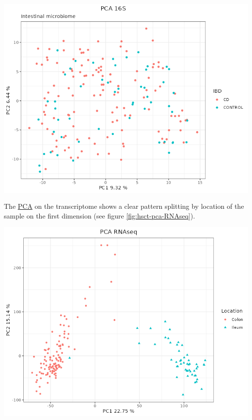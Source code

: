 \documentclass[
  12pt,
  a4paper,
  twoside,
  openright]{book}
\let\origfigure\figure
\let\endorigfigure\endfigure
\renewenvironment{figure}[1][2] {
    \expandafter\origfigure\expandafter[!htbp]
} {
    \endorigfigure
}
\begin{document}
\begin{figure}
\includegraphics[width=1\linewidth]{images/HSCT_PCA_16S} \caption[PCA of 16S data from the HSCT dataset.]{PCA of the 16S data from the HSCT dataset. There are no clear patterns according to the location. Each point represents a sample (colored and shaped by location).}\label{fig:hsct-pca-16s}
\end{figure}

The \protect\hyperlink{acronyms_PCA}{PCA} on the transcriptome shows a clear pattern splitting by location of the sample on the first dimension (see figure \ref{fig:hsct-pca-RNAseq}).

\begin{figure}
\includegraphics[width=1\linewidth]{images/HSCT_PCA_RNAseq} \caption[PCA of RNAseq data from the HSCT dataset.]{PCA of the RNAseq data from the HSCT dataset. The samples separate according to the location. Each point represents a sample (colored and shaped by location).}\label{fig:hsct-pca-RNAseq}
\end{figure}
\end{document}
